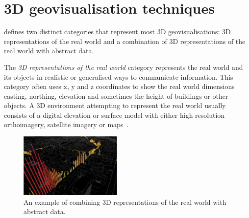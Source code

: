 \section{3D geovisualisation techniques} {

	\textcite{bleisch2012geovisualization} defines two distinct categories that represent most 3D geovisualisations: 3D representations of the real world and a combination of 3D representations of the real world with abstract data.

	The \emph{3D representations of the real world} category represents the real world and its objects in realistic or generalised ways to communicate information. This category often uses x, y and z coordinates to show the real world dimensions \textendash\, easting, northing, elevation and sometimes the height of buildings or other objects. A 3D environment attempting to represent the real world usually consists of a digital elevation or surface model with either high resolution orthoimagery, satellite imagery or maps~\parencite{bleisch2012geovisualization}.

	\newcommand{\combinationwidth}{0.45\textwidth}
	\begin{figure}
		\vspace{-12pt}
		\centering
		\captionsetup{font=small}
        \includegraphics[width=\combinationwidth]{images/literature/category-combination}
		\caption{An example of combining 3D representations of the real world with abstract data. \protect\footnotemark}
		\label{fig:category_combination}
		\vspace{-8pt}
	\end{figure}


}
